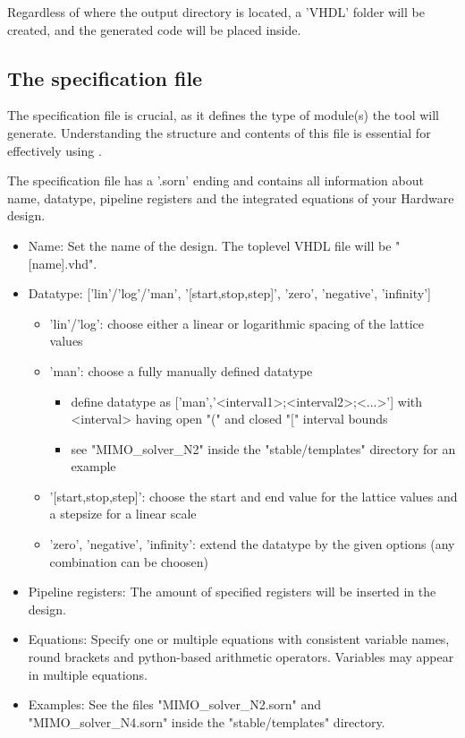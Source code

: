 \documentclass{article}
\begin{document}
Regardless of where the output directory is located, a 'VHDL' folder will be created, and the generated code will be placed inside.

\subsection{The specification file}
\label{ter:spec_file}
The specification file is crucial, as it defines the type of module(s) the tool will generate. Understanding the structure and contents of this file is essential for effectively using \ProjectName.

The specification file has a '.sorn' ending and contains all information about name, datatype, pipeline registers and the integrated equations of your Hardware design.

\begin{itemize}
    \item Name: Set the name of the design. The toplevel VHDL file will be "[name].vhd".
    \item Datatype: ['lin'/'log'/'man', '[start,stop,step]', 'zero', 'negative', 'infinity']
    \begin{itemize}
        \item 'lin'/'log': choose either a linear or logarithmic spacing of the lattice values
        \item 'man': choose a fully manually defined datatype
        \begin{itemize}
            \item define datatype as ['man','{<interval1>;<interval2>;<...>}'] with <interval> having open "(" and closed "[" interval bounds
            \item see "MIMO\_solver\_N2" inside the "stable/templates" directory for an example
        \end{itemize}
        \item '[start,stop,step]': choose the start and end value for the lattice values and a stepsize for a linear scale 
        \item 'zero', 'negative', 'infinity': extend the datatype by the given options (any combination can be choosen)
    \end{itemize}
    \item Pipeline registers: The amount of specified registers will be inserted in the design.
    \item Equations: Specify one or multiple equations with consistent variable names, round brackets and python-based arithmetic operators. Variables may appear in multiple equations.
    \item Examples: See the files "MIMO\_solver\_N2.sorn" and "MIMO\_solver\_N4.sorn" inside the "stable/templates" directory.
\end{itemize}
\end{document}
